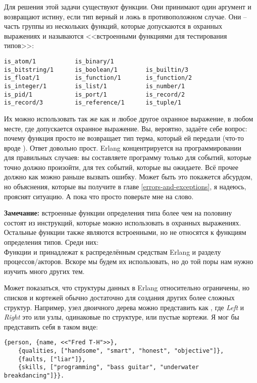 Для решения этой задачи существуют функции.
Они принимают один аргумент и возвращают истину, если тип верный и ложь в противоположном случае.
Они \--- часть группы из нескольких функций, которые допускаются в охранных выражениях и называются <<встроенными функциями для тестирования типов>>:
\begin{lstlisting}[style=erlang]
is_atom/1           is_binary/1        
is_bitstring/1      is_boolean/1        is_builtin/3       
is_float/1          is_function/1       is_function/2      
is_integer/1        is_list/1           is_number/1        
is_pid/1            is_port/1           is_record/2        
is_record/3         is_reference/1      is_tuple/1        
\end{lstlisting}

Их можно использовать так же как и любое другое охранное выражение, в любом месте, где допускается охранное выражение.
Вы, вероятно, задаёте себе вопрос: почему функция просто не возвращает тип терма, который ей передали (что\--то вроде ).
Ответ довольно прост.
Erlang концентрируется на программировании для правильных случаев: вы составляете программу только для событий, которые точно должно произойти, для тех событий, которые вы ожидаете.
Всё прочее должно как можно раньше вызвать ошибку.
Может быть это покажется абсурдом, но объяснения, которые вы получите в главе \ref{errors-and-exceptions}, я надеюсь, прояснят ситуацию.
А пока что просто поверьте мне на слово.\\
\colorbox{lgray}
{
    \begin{minipage}{\linewidth}
\textbf{Замечание:} встроенные функции определения типа более чем на половину состоят из инструкций, которые можно использовать в охранных выражениях.
Остальные функции также являются встроенными, но не относятся к функциям определения типов.
Среди них: 
\\
Функции  и  принадлежат к распределённым средствам Erlang и разделу процессов/акторов.
Вскоре мы будем их использовать, но до той поры нам нужно изучить много других тем.
    \end{minipage}
}

Может показаться, что структуры данных в Erlang относительно ограничены, но списков и кортежей обычно достаточно для создания других более сложных структур.
Например, узел двоичного дерева можно представить как , где \emph{Left} и \emph{Right} это или узлы, одинаковые по структуре, или пустые кортежи.
Я мог бы представить себя в таком виде:
\begin{lstlisting}[style=erlang]
{person, {name, <<"Fred T-H">>},
    {qualities, ["handsome", "smart", "honest", "objective"]},
    {faults, ["liar"]},
    {skills, ["programming", "bass guitar", "underwater breakdancing"]}}.
\end{lstlisting}

